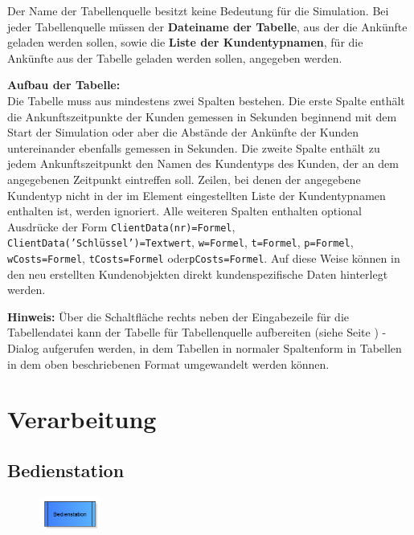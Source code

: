 Der Name der Tabellenquelle besitzt keine Bedeutung für die Simulation.
Bei jeder Tabellenquelle müssen der \textbf{Dateiname der Tabelle}, aus
der die Ankünfte geladen werden sollen, sowie die \textbf{Liste der Kundentypnamen},
für die Ankünfte aus der Tabelle geladen werden sollen, angegeben werden.

\textbf{Aufbau der Tabelle:}~\\
Die Tabelle muss aus mindestens zwei Spalten bestehen. Die erste Spalte enthält die Ankunftszeitpunkte
der Kunden gemessen in Sekunden beginnend mit dem Start der Simulation oder aber die Abstände
der Ankünfte der Kunden untereinander ebenfalls gemessen in Sekunden. Die zweite Spalte
enthält zu jedem Ankunftszeitpunkt den Namen des Kundentyps des Kunden, der an dem
angegebenen Zeitpunkt eintreffen soll. Zeilen, bei denen der angegebene Kundentyp
nicht in der im Element eingestellten Liste der Kundentypnamen enthalten ist, werden ignoriert.
Alle weiteren Spalten enthalten optional Ausdrücke der Form \texttt{ClientData(nr)=Formel},
\texttt{ClientData('Schlüssel')=Textwert}, \texttt{w=Formel}, \texttt{t=Formel},
\texttt{p=Formel}, \texttt{wCosts=Formel}, \texttt{tCosts=Formel} oder\texttt{pCosts=Formel}.
Auf diese Weise können in den neu erstellten Kundenobjekten direkt kundenspezifische Daten
hinterlegt werden. 

\textbf{Hinweis:}
Über die Schaltfläche rechts neben der Eingabezeile für die Tabellendatei kann der
Tabelle für Tabellenquelle aufbereiten (siehe Seite \pageref{ref:ProcessClientTable}) -Dialog
aufgerufen werden, in dem Tabellen in normaler Spaltenform in Tabellen in dem oben
beschriebenen Format umgewandelt werden können.





\chapter{Verarbeitung}

\section{Bedienstation}
\label{ref:ModelElementProcess}

\begin{figure}
\vspace{-22pt}
\includegraphics[width=2cm]{imageModelElementProcess.png}
\vspace{-22pt}
\end{figure}

